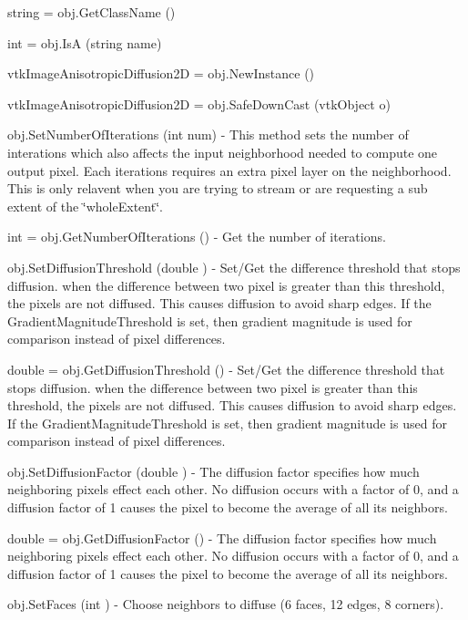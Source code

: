 \begin{DoxyItemize}
\item {\ttfamily string = obj.\-Get\-Class\-Name ()}  
\item {\ttfamily int = obj.\-Is\-A (string name)}  
\item {\ttfamily vtk\-Image\-Anisotropic\-Diffusion2\-D = obj.\-New\-Instance ()}  
\item {\ttfamily vtk\-Image\-Anisotropic\-Diffusion2\-D = obj.\-Safe\-Down\-Cast (vtk\-Object o)}  
\item {\ttfamily obj.\-Set\-Number\-Of\-Iterations (int num)} -\/ This method sets the number of interations which also affects the input neighborhood needed to compute one output pixel. Each iterations requires an extra pixel layer on the neighborhood. This is only relavent when you are trying to stream or are requesting a sub extent of the \char`\"{}whole\-Extent\char`\"{}.  
\item {\ttfamily int = obj.\-Get\-Number\-Of\-Iterations ()} -\/ Get the number of iterations.  
\item {\ttfamily obj.\-Set\-Diffusion\-Threshold (double )} -\/ Set/\-Get the difference threshold that stops diffusion. when the difference between two pixel is greater than this threshold, the pixels are not diffused. This causes diffusion to avoid sharp edges. If the Gradient\-Magnitude\-Threshold is set, then gradient magnitude is used for comparison instead of pixel differences.  
\item {\ttfamily double = obj.\-Get\-Diffusion\-Threshold ()} -\/ Set/\-Get the difference threshold that stops diffusion. when the difference between two pixel is greater than this threshold, the pixels are not diffused. This causes diffusion to avoid sharp edges. If the Gradient\-Magnitude\-Threshold is set, then gradient magnitude is used for comparison instead of pixel differences.  
\item {\ttfamily obj.\-Set\-Diffusion\-Factor (double )} -\/ The diffusion factor specifies how much neighboring pixels effect each other. No diffusion occurs with a factor of 0, and a diffusion factor of 1 causes the pixel to become the average of all its neighbors.  
\item {\ttfamily double = obj.\-Get\-Diffusion\-Factor ()} -\/ The diffusion factor specifies how much neighboring pixels effect each other. No diffusion occurs with a factor of 0, and a diffusion factor of 1 causes the pixel to become the average of all its neighbors.  
\item {\ttfamily obj.\-Set\-Faces (int )} -\/ Choose neighbors to diffuse (6 faces, 12 edges, 8 corners).  

\end{DoxyItemize}
